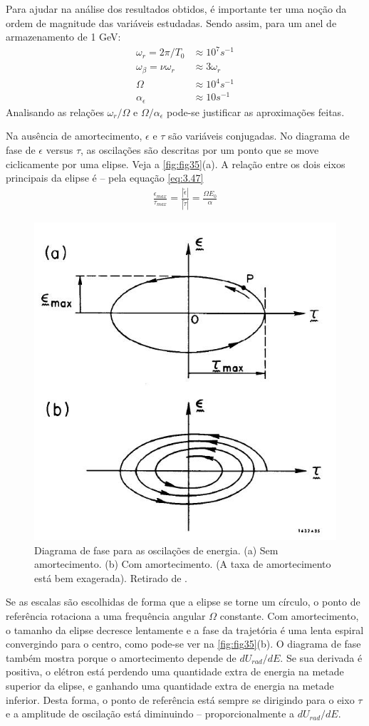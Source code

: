 Para ajudar na análise dos resultados obtidos, é importante ter uma noção da ordem de magnitude das variáveis estudadas. Sendo assim, para um anel de armazenamento de 1 GeV:
\begin{align*}
	\omega_r = 2\pi /T_0 &\approx 10^7 s^{-1}\\
	\omega_\beta = \nu \omega_r &\approx 3\omega_r\\
	\Omega &\approx 10^4 s^{-1}\\
	\alpha_\epsilon &\approx 10 s^{-1}
\end{align*}
Analisando as relações $\omega_r/\Omega$ e $\Omega/\alpha_\epsilon$ pode-se justificar as aproximações feitas.

Na ausência de amortecimento, $\epsilon$ e $\tau$ são variáveis conjugadas. No diagrama de fase de $\epsilon$ versus $\tau$, as oscilações são descritas por um ponto que se move ciclicamente por uma elipse. Veja a \autoref{fig:fig35}(a). A relação entre os dois eixos principais da elipse é -- pela equação \eqref{eq:3.47}
\begin{align}
	\frac{\epsilon_{max}}{\tau_{max}} = \frac{|\tilde{\epsilon}|}{|\tilde{\tau}|} = \frac{\Omega E_0}{\alpha}
\end{align} 

\begin{figure}[!htb]
	\centering
	\includegraphics[width=0.6\linewidth]{./Figuras/fig35.jpeg}
	\caption{Diagrama de fase para as oscilações de energia. (a) Sem amortecimento. (b) Com amortecimento. (A taxa de amortecimento está bem exagerada). Retirado de \cite{sands1970physics}.}
	\label{fig:fig35}
\end{figure}

Se as escalas são escolhidas de forma que a elipse se torne um círculo, o ponto de referência rotaciona a uma frequência angular $\Omega$ constante. Com amortecimento, o tamanho da elipse decresce lentamente e a fase da trajetória é uma lenta espiral convergindo para o centro, como pode-se ver na \autoref{fig:fig35}(b). O diagrama de fase também mostra porque o amortecimento depende de $dU_{rad}/dE$. Se sua derivada é positiva, o elétron está perdendo uma quantidade extra de energia na metade superior da elipse, e ganhando uma quantidade extra de energia na metade inferior. Desta forma, o ponto de referência está sempre se dirigindo para o eixo $\tau$ e a amplitude de oscilação está diminuindo -- proporcionalmente a $dU_{rad}/dE$.

